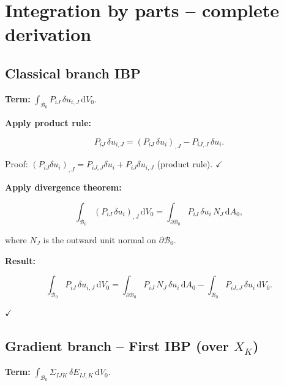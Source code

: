 \documentclass[11pt]{article}
\begin{document}
\section{Integration by parts -- complete derivation}

\subsection{Classical branch IBP}
\label{fd:ibp_P_summary}

\textbf{Term:} $\displaystyle\int_{\mathcal{B}_{0}}
P_{iJ}\,\delta u_{i,J}\,\mathrm{d}V_{0}$.

\textbf{Apply product rule:}

\begin{equation}
P_{iJ}\,\delta u_{i,J}
= (P_{iJ}\,\delta u_{i})_{,J}
- P_{iJ,J}\,\delta u_{i}.
\end{equation}

Proof: $(P_{iJ}\delta u_{i})_{,J}
= P_{iJ,J}\delta u_{i} + P_{iJ}\delta u_{i,J}$ (product rule). $\checkmark$

\textbf{Apply divergence theorem:}

\begin{equation}
\int_{\mathcal{B}_{0}}(P_{iJ}\,\delta u_{i})_{,J}\,\mathrm{d}V_{0}
= \int_{\partial\mathcal{B}_{0}}P_{iJ}\,\delta u_{i}\,N_{J}\,
  \mathrm{d}A_{0},
\end{equation}

where $N_{J}$ is the outward unit normal on $\partial\mathcal{B}_{0}$.

\textbf{Result:}

\begin{equation}
\int_{\mathcal{B}_{0}}P_{iJ}\,\delta u_{i,J}\,\mathrm{d}V_{0}
= \int_{\partial\mathcal{B}_{0}}P_{iJ}\,N_{J}\,\delta u_{i}\,
  \mathrm{d}A_{0}
- \int_{\mathcal{B}_{0}}P_{iJ,J}\,\delta u_{i}\,\mathrm{d}V_{0}.
\end{equation}

$\checkmark$

\subsection{Gradient branch -- First IBP (over $X_K$)}

\textbf{Term:} $\displaystyle\int_{\mathcal{B}_{0}}
\Sigma_{IJK}\,\delta E_{IJ,K}\,\mathrm{d}V_{0}$.
\end{document}
